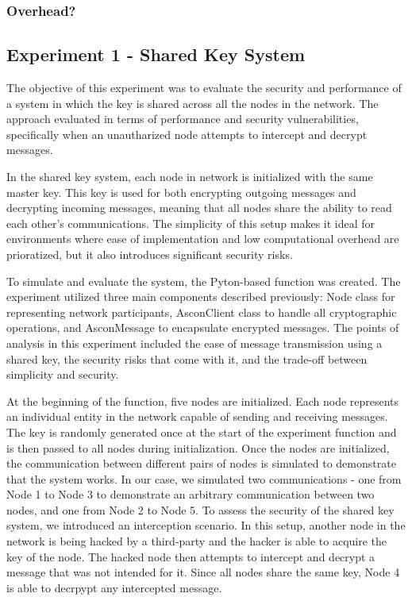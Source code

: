 \documentclass[journal]{IEEEtran}
\begin{document}
\subsubsection{Overhead?}

\subsection{Experiment 1 - Shared Key System}
The objective of this experiment was to evaluate the security and performance of a system in which the key is shared across all the nodes in the network. The approach evaluated in terms of performance and security vulnerabilities, specifically when an unautharized node attempts to intercept and decrypt messages.

In the shared key system, each node in network is initialized with the same master key. This key is used for both encrypting outgoing messages and decrypting incoming messages, meaning that all nodes share the ability to read each other's communications. The simplicity of this setup makes it ideal for environments where ease of implementation and low computational overhead are prioratized, but it also introduces significant security risks.

To simulate and evaluate the system, the Pyton-based function was created. The experiment utilized three main components described previously: Node class for representing network participants, AsconClient class to handle all cryptographic operations, and AsconMessage to encapsulate encrypted messages. The points of analysis in this experiment included the ease of message transmission using a shared key, the security risks that come with it, and the trade-off between simplicity and security.

At the beginning of the function, five nodes are initialized. Each node represents an individual entity in the network capable of sending and receiving messages. The key is randomly generated once at the start of the experiment function and is then passed to all nodes during initialization. Once the nodes are initialized, the communication between different pairs of nodes is simulated to demonstrate that the system works. In our case, we simulated two communications - one from Node 1 to Node 3 to demonstrate an arbitrary communication between two nodes, and one from Node 2 to Node 5. To assess the security of the shared key system, we introduced an interception scenario. In this setup, another node in the network is being hacked by a third-party and the hacker is able to acquire the key of the node. The hacked node then attempts to intercept and decrypt a message that was not intended for it. Since all nodes share the same key, Node 4 is able to decrpypt any intercepted message.
\end{document}
